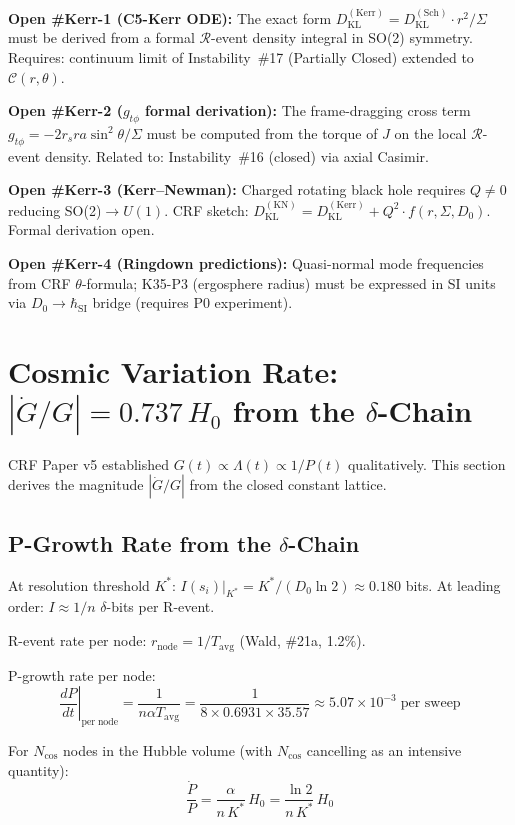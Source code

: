 \documentclass[12pt, a4paper]{article}
\begin{document}
\begin{openqbox}[title={Open: C5-Kerr ODE and Kerr--Newman Extension}]
\textbf{Open \#Kerr-1 (C5-Kerr ODE):} The exact form
$D_{\mathrm{KL}}^{(\mathrm{Kerr})} = D_{\mathrm{KL}}^{(\mathrm{Sch})}\cdot r^2/\Sigma$
must be derived from a formal $\mathcal{R}$-event density integral in SO(2) symmetry.
Requires: continuum limit of Instability~\#17 (Partially Closed) extended to $\mathcal{C}(r,\theta)$.

\textbf{Open \#Kerr-2 ($g_{t\phi}$ formal derivation):} The frame-dragging cross term
$g_{t\phi} = -2r_s r a\sin^2\theta/\Sigma$ must be computed from the torque of $J$ on
the local $\mathcal{R}$-event density. Related to: Instability~\#16 (closed) via axial Casimir.

\textbf{Open \#Kerr-3 (Kerr--Newman):} Charged rotating black hole requires $Q\neq 0$
reducing SO(2)$\to U(1)$. CRF sketch: $D_{\mathrm{KL}}^{(\mathrm{KN})} = D_{\mathrm{KL}}^{(\mathrm{Kerr})}
+ Q^2\cdot f(r,\Sigma, D_0)$. Formal derivation open.

\textbf{Open \#Kerr-4 (Ringdown predictions):} Quasi-normal mode frequencies from CRF
$\theta$-formula; K35-P3 (ergosphere radius) must be expressed in SI units via
$D_0 \to \hbar_{\mathrm{SI}}$ bridge (requires P0 experiment).
\end{openqbox}

\section{Cosmic Variation Rate: $|\dot{G}/G| = 0.737\,H_0$ from the $\delta$-Chain}

CRF Paper v5 established $G(t)\propto\Lambda(t)\propto 1/P(t)$ qualitatively.
This section derives the magnitude $|\dot{G}/G|$ from the closed constant lattice.

\subsection{P-Growth Rate from the $\delta$-Chain}

\begin{derivedbox}[title={Information per R-Event and P-Growth Rate}]
At resolution threshold $K^*$: $I(s_i)\big|_{K^*} = K^*/(D_0\ln 2) \approx 0.180$
bits. At leading order: $I \approx 1/n$ $\delta$-bits per R-event.

R-event rate per node: $r_{\mathrm{node}} = 1/T_{\mathrm{avg}}$ (Wald, \#21a, 1.2\%).

P-growth rate per node:
\[
  \left.\frac{dP}{dt}\right|_{\mathrm{per\;node}}
  = \frac{1}{n\alpha T_{\mathrm{avg}}}
  = \frac{1}{8\times 0.6931\times 35.57}\approx 5.07\times 10^{-3}\;\text{per sweep}
\]

For $N_{\mathrm{cos}}$ nodes in the Hubble volume (with $N_{\mathrm{cos}}$ cancelling
as an intensive quantity):
\[
  \frac{\dot{P}}{P} = \frac{\alpha}{n\,K^*}\,H_0 = \frac{\ln 2}{n\,K^*}\,H_0
\]
\end{derivedbox}
\end{document}
